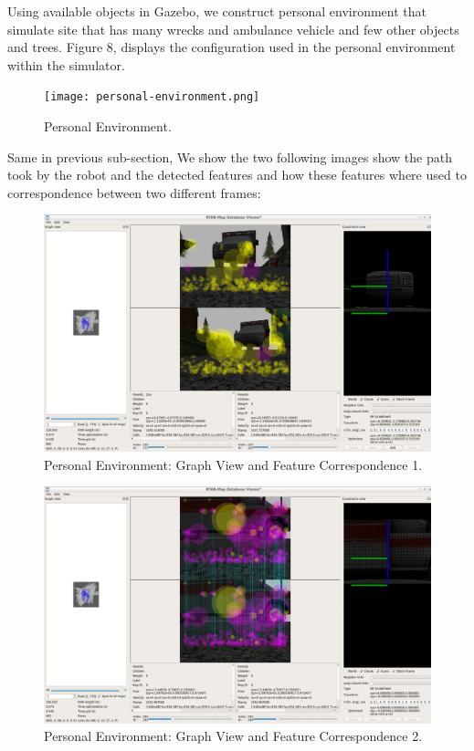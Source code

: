 \documentclass[10pt,journal,compsoc]{IEEEtran}
\begin{document}
Using available objects in Gazebo, we construct personal environment that simulate site that has many wrecks and ambulance vehicle and few other objects and trees. Figure 8, displays the configuration used in the personal environment within the simulator.

\begin{figure}[thpb]
      \centering
      \texttt{[image: personal-environment.png]}
      \caption{Personal Environment.}
      \label{fig:network-training}
\end{figure}

Same in previous sub-section, We show the two following images show the path took by the robot and the detected features and how these features where used to correspondence between two different frames:

\begin{figure}[thpb]
      \centering
      \includegraphics[width=\linewidth]{rtab-map-viewer-correspondence1.png}
      \caption{Personal Environment: Graph View and Feature Correspondence 1.}
      \label{fig:network-training}
\end{figure}

\begin{figure}[thpb]
      \centering
      \includegraphics[width=\linewidth]{rtab-map-viewer-correspondence2.png}
      \caption{Personal Environment: Graph View and Feature Correspondence 2.}
      \label{fig:network-training}
\end{figure}
\end{document}
